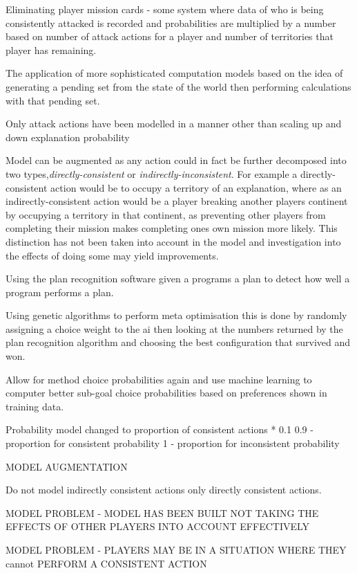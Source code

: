 \documentclass[parskip]{cs4rep}
\begin{document}
Eliminating player mission cards - some system where data of who is being consistently attacked is recorded and probabilities are multiplied by a number based on number of attack actions for a player and number of territories that player has remaining.

The application of more sophisticated computation models based on the idea of generating a pending set from the state of the world then performing calculations with that pending set.

Only attack actions have been modelled in a manner other than scaling up and down explanation probability

Model can be augmented as any action could in fact be further decomposed into two types,\textit{directly-consistent} or \textit{indirectly-inconsistent}. For example a directly-consistent action would be to occupy a territory of an explanation, where as an indirectly-consistent action would be a player breaking another players continent by occupying a territory in that continent, as preventing other players from completing their mission makes completing ones own mission more likely. This distinction has not been taken into account in the model and investigation into the effects of doing some may yield improvements.

Using the plan recognition software given a programs a plan to detect how well a program performs a plan. 

Using genetic algorithms to perform meta optimisation this is done by randomly assigning a choice weight to the ai then looking at the numbers returned by the plan recognition algorithm and choosing the best configuration that survived and won.

Allow for method choice probabilities again and use machine learning to computer better sub-goal choice probabilities based on preferences shown in training data.

Probability model changed to proportion of consistent actions * 0.1 
0.9 - proportion for consistent probability
1 - proportion for inconsistent probability

MODEL AUGMENTATION

Do not model indirectly consistent actions only directly consistent actions.

MODEL PROBLEM - MODEL HAS BEEN BUILT NOT TAKING THE EFFECTS OF OTHER PLAYERS INTO ACCOUNT EFFECTIVELY

MODEL PROBLEM - PLAYERS MAY BE IN A SITUATION WHERE THEY cannot PERFORM A CONSISTENT ACTION
\end{document}
